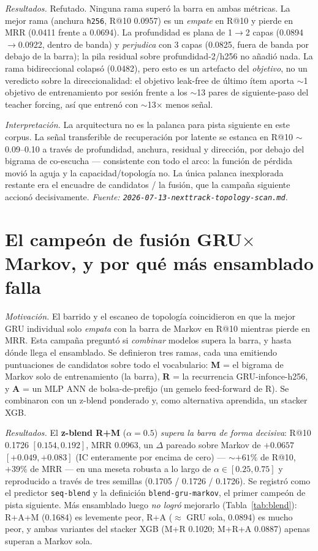 \documentclass[11pt]{article}
\begin{document}
\emph{Resultados.} Refutado. Ninguna rama superó la barra en ambas métricas. La
mejor rama (anchura \texttt{h256}, R@10 \num{0.0957}) es un \emph{empate} en
R@10 y pierde en MRR (\num{0.0411} frente a \num{0.0694}). La profundidad es
plana de 1$\to$2 capas (\num{0.0894}$\to$\num{0.0922}, dentro de banda) y
\emph{perjudica} con 3 capas (\num{0.0825}, fuera de banda por debajo de la
barra); la pila residual sobre profundidad-2/h256 no añadió nada. La rama
bidireccional colapsó (\num{0.0482}), pero esto es un artefacto del
\emph{objetivo}, no un veredicto sobre la direccionalidad: el objetivo leak-free
de último ítem aporta $\sim$1 objetivo de entrenamiento por sesión frente a los
$\sim$13 pares de siguiente-paso del teacher forcing, así que entrenó con
$\sim$13$\times$ menos señal.

\emph{Interpretación.} La arquitectura no es la palanca para pista siguiente en
este corpus. La señal transferible de recuperación por latente se estanca en
R@10 $\sim$0.09--0.10 a través de profundidad, anchura, residual y dirección,
por debajo del bigrama de co-escucha --- consistente con todo el arco: la
función de pérdida movió la aguja y la capacidad/topología no. La única palanca
inexplorada restante era el encuadre de candidatos / la fusión, que la campaña
siguiente accionó decisivamente.
\emph{Fuente: \texttt{2026-07-13-nexttrack-topology-scan.md}.}

\section{El campeón de fusión GRU$\times$Markov, y por qué más ensamblado falla}
\label{sec:blend}
\emph{Motivación.} El barrido y el escaneo de topología coincidieron en que la
mejor GRU individual solo \emph{empata} con la barra de Markov en R@10 mientras
pierde en MRR. Esta campaña preguntó si \emph{combinar} modelos supera la barra,
y hasta dónde llega el ensamblado. Se definieron tres ramas, cada una emitiendo
puntuaciones de candidatos sobre todo el vocabulario: \textbf{M} = el bigrama de
Markov solo de entrenamiento (la barra), \textbf{R} = la recurrencia
GRU-infonce-h256, y \textbf{A} = un MLP ANN de bolsa-de-prefijo (un gemelo
feed-forward de R). Se combinaron con un z-blend ponderado y, como alternativa
aprendida, un stacker XGB.

\emph{Resultados.} El \textbf{z-blend R+M} ($\alpha{=}0.5$) \emph{supera la barra
de forma decisiva}: R@10 \num{0.1726} $[0.154, 0.192]$, MRR \num{0.0963}, un
$\Delta$ pareado sobre Markov de $+\num{0.0657}$ $[+0.049, +0.083]$ (IC
enteramente por encima de cero) --- $\sim$$+61\%$ de R@10, $+39\%$ de MRR --- en
una meseta robusta a lo largo de $\alpha \in [0.25, 0.75]$ y reproducido a
través de tres semillas (\num{0.1705} / \num{0.1726} / \num{0.1726}). Se
registró como el predictor \texttt{seq-blend} y la definición
\texttt{blend-gru-markov}, el primer campeón de pista siguiente. Más ensamblado
luego \emph{no logró} mejorarlo (Tabla~\ref{tab:blend}): R+A+M (\num{0.1684}) es
levemente peor, R+A ($\approx$ GRU sola, \num{0.0894}) es mucho peor, y ambas
variantes del stacker XGB (M+R \num{0.1020}; M+R+A \num{0.0887}) apenas superan a
Markov sola.
\end{document}
